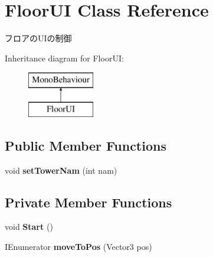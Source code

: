 \hypertarget{class_floor_u_i}{}\section{Floor\+UI Class Reference}
\label{class_floor_u_i}


フロアの\+U\+Iの制御  


Inheritance diagram for Floor\+UI\+:\begin{figure}[H]
\begin{center}
\leavevmode
\includegraphics[height=2.000000cm]{class_floor_u_i}
\end{center}
\end{figure}
\subsection*{Public Member Functions}
\begin{DoxyCompactItemize}
\item 
\mbox{\label{class_floor_u_i_acd3f72a1817b774344b4ede8f5995eb0}} 
void {\bfseries set\+Tower\+Nam} (int nam)
\end{DoxyCompactItemize}
\subsection*{Private Member Functions}
\begin{DoxyCompactItemize}
\item 
\mbox{\label{class_floor_u_i_aef732b6ce4510dec531038ef1c907da6}} 
void {\bfseries Start} ()
\item 
\mbox{\label{class_floor_u_i_ad66929ef5bdfdf39d2a2d9a54b02e934}} 
I\+Enumerator {\bfseries move\+To\+Pos} (Vector3 pos)
\end{DoxyCompactItemize}
